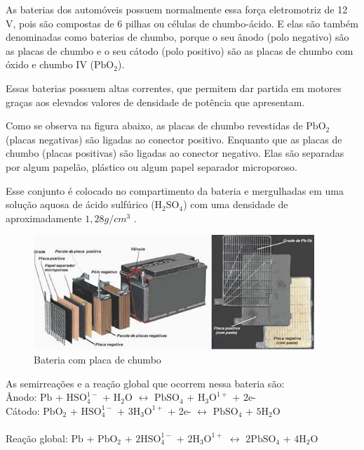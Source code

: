 As baterias dos automóveis possuem normalmente essa força eletromotriz de 12 V,
pois são compostas de 6 pilhas ou células de chumbo-ácido. E elas são também
denominadas como baterias de chumbo, porque o seu ânodo (polo negativo) são as
placas de chumbo e o seu cátodo (polo positivo) são as placas de chumbo com óxido
 e chumbo IV ($\mathrm{Pb O_2}$).


Essas baterias possuem altas correntes, que permitem dar partida em motores
 graças aos elevados valores de densidade de potência que apresentam.

Como se observa na figura abaixo, as placas de chumbo revestidas de $\mathrm{Pb O_2}$
(placas negativas) são ligadas ao conector positivo. Enquanto que as placas de chumbo
(placas positivas) são ligadas ao conector negativo. Elas são separadas por algum
papelão, plástico ou algum papel separador microporoso.

Esse conjunto é colocado no compartimento da bateria e mergulhadas em uma solução
aquosa de ácido sulfúrico ($\mathrm{H_2 SO_4}$) com uma densidade de
aproximadamente $1,28 g/cm^{3}$	.

\begin{figure}[h]
  \centering
  \includegraphics[width=400px, scale=1]{figuras/bateria}
  \caption{Bateria com placa de chumbo}
\end{figure}

As semirreações e a reação global que ocorrem nessa bateria são:\\
Ânodo: $\mathrm{Pb}$ + $\mathrm{HSO_4^{1-}}$ + $\mathrm{H_2 O}$ $\leftrightarrow$
 $\mathrm{PbSO_4}$ + $\mathrm{H_3 O^{1+}}$ + 2e-\\

Cátodo: $\mathrm{Pb O_2}$ + $\mathrm{HSO_4^{1-}}$ + $\mathrm{3 H_3 O^{1+}}$ +
2e- $\leftrightarrow$ $\mathrm{PbSO_4}$ + $\mathrm{5 H_2 O}$\\

\dotfill\\
Reação global: $\mathrm{Pb}$ + $\mathrm{PbO_2}$ + $\mathrm{2HSO_4^{1-}}$ +
$\mathrm{2H_3 O^{1+}}$ $\leftrightarrow$ $\mathrm{2PbSO_4}$ + $\mathrm{4 H_2 O}$

